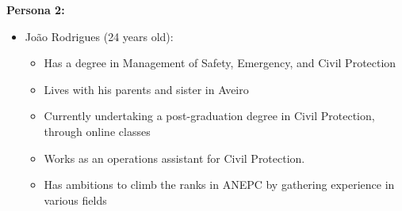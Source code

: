 \textbf{Persona 2:}
\begin{itemize}
    \item João Rodrigues (24 years old):
    \begin{itemize}
    \item Has a degree in Management of
    Safety, Emergency, and Civil Protection
    \item Lives with his parents and sister in Aveiro
    \item Currently undertaking a post-graduation degree in Civil Protection,
    through online classes
    \item Works as an operations assistant for Civil Protection. 
    \item Has ambitions to
    climb the ranks in ANEPC by gathering experience in various fields
    \end{itemize}
\end{itemize}
